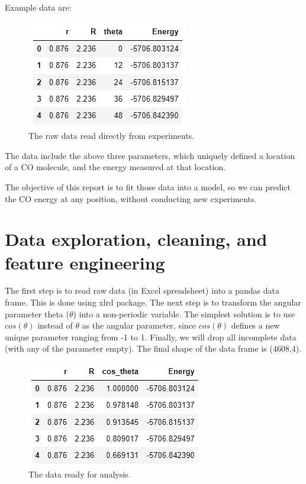 \documentclass[11pt]{article}
\begin{document}
\newpage

Example data are:
\begin{figure}[h]
\centerline{\includegraphics[scale=0.8]{data1.png}}
\caption{The raw data read directly from experiments.}
\end{figure}

The data include the above three parameters, which uniquely defined a location of a CO molecule, and the energy measured at that location.

The objective of this report is to fit those data into a model, so we can predict the CO energy at any position, without conducting new experiments.

\section{Data exploration, cleaning, and feature engineering}\label{section-introduction-2}
The first step is to read raw data (in Excel spreadsheet) into a pandas data frame. This is done using xlrd package.
The next step is to transform the angular parameter theta ($\theta$) into a non-periodic variable.
The simplest solution is to use $cos(\theta)$ instead of $\theta$ as the angular parameter, since $cos(\theta)$ defines a new unique parameter ranging from -1 to 1.
Finally, we will drop all incomplete data (with any of the parameter empty).
The final shape of the data frame is (4608,4).

\begin{figure}[h]
\centerline{\includegraphics[scale=0.8]{data2.png}}
\caption{The data ready for analysis.}
\end{figure}
\end{document}
